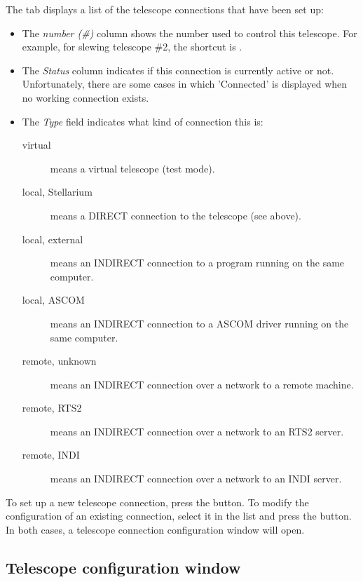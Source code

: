 \noindent The  tab displays a list of the telescope connections that have been set up:

\begin{itemize}
\item The \emph{number (\#)} column shows the number used to control this
  telescope. For example, for slewing telescope \#2, the shortcut is
  .
\item The \emph{Status} column indicates if this connection is
  currently active or not. Unfortunately, there are some cases in
  which 'Connected' is displayed when no working connection exists.
\item The \emph{Type} field indicates what kind of connection this is:
  \begin{description}
  \item[virtual] means a virtual telescope (test mode).
  \item[local, Stellarium] means a DIRECT connection to the telescope (see above).
  \item[local, external] means an INDIRECT connection to a program running on the same computer.
  \item[local, ASCOM] means an INDIRECT connection to a ASCOM driver running on the same computer.
  \item[remote, unknown] means an INDIRECT connection over a network to a remote machine.
  \item[remote, RTS2] means an INDIRECT connection over a network to an RTS2 server.
  \item[remote, INDI] means an INDIRECT connection over a network to an INDI server.
  \end{description}
\end{itemize}

\noindent To set up a new telescope connection, press the  button. To modify
the configuration of an existing connection, select it in the list and
press the  button. In both cases, a telescope connection
configuration window will open.



\subsection{Telescope configuration window}

